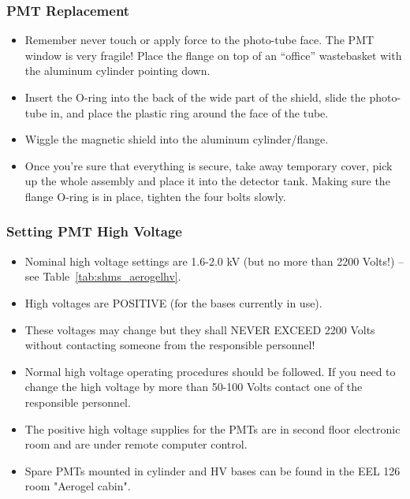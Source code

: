 \subsubsection*{PMT Replacement}

\begin{itemize}
\item Remember never touch or apply force to the photo-tube face. The
  PMT window is very fragile!  Place the flange on top of an
  ``office'' wastebasket with the aluminum cylinder pointing down.
\item Insert the O-ring into the  back of the wide part of the
  shield, slide the photo-tube in, and  place the plastic ring around
  the face of the tube.
\item Wiggle the  magnetic shield into the
  aluminum cylinder/flange.
\item Once you're sure  that everything is
  secure, take away temporary cover, pick up the  whole assembly and
  place it into the detector tank. Making sure the  flange O-ring is
  in place, tighten the four bolts slowly.
\end{itemize}

\subsubsection{Setting PMT High Voltage}
\begin{itemize}
\item Nominal high voltage settings are  1.6-2.0 kV (but no more
  than 2200 Volts!) – see Table~\ref{tab:shms_aerogelhv}.
\item High  voltages are POSITIVE (for
  the bases currently in use).
\item These  voltages may change but they
  shall NEVER EXCEED 2200 Volts without  contacting someone from the
  responsible personnel!
\item Normal high voltage operating
  procedures should be followed. If you need to  change the high
  voltage by more than 50-100 Volts contact one of the  responsible
  personnel.
\item The positive high voltage supplies for the  PMTs are in
  second floor electronic room and are under remote computer control.
\cite{howto:CAEN_HV_operation}
\item Spare
  PMTs mounted in cylinder and HV bases can be found in the EEL 126
  room "Aerogel cabin". 
\end{itemize}

